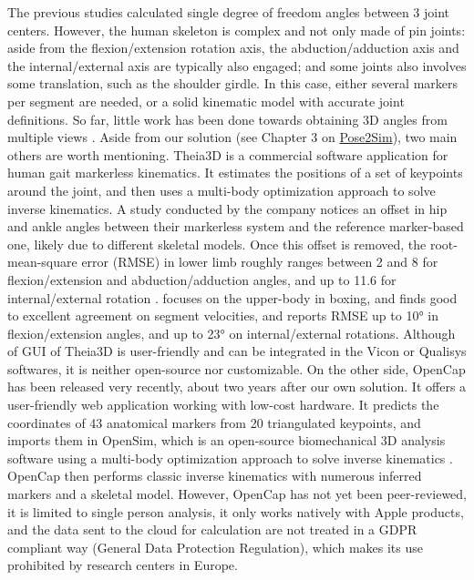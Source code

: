 \newpage
The previous studies calculated single degree of freedom angles between 3 joint centers. However, the human skeleton is complex and not only made of pin joints: aside from the flexion/extension rotation axis, the abduction/adduction axis and the internal/external axis are typically also engaged; and some joints also involves some translation, such as the shoulder girdle. In this case, either several markers per segment are needed, or a solid kinematic model with accurate joint definitions. So far, little work has been done towards obtaining 3D angles from multiple views \cite{Zheng2022}. Aside from our solution (see Chapter 3 on \hyperref[ch:3]{Pose2Sim}), two main others are worth mentioning. Theia3D is a commercial software application for human gait markerless kinematics. It estimates the positions of a set of keypoints around the joint, and then uses a multi-body optimization approach to solve inverse kinematics. A study conducted by the company notices an offset in hip and ankle angles between their markerless system and the reference marker-based one, likely due to different skeletal models. Once this offset is removed, the root-mean-square error (RMSE) in lower limb roughly ranges between 2 and 8\degree{} for flexion/extension and abduction/adduction angles, and up to 11.6\degree{} for internal/external rotation \cite{Kanko2021b}. \cite{Lahkar2022b} focuses on the upper-body in boxing, and finds good to excellent agreement on segment velocities, and reports RMSE up to 10° in  flexion/extension angles, and up to 23° on internal/external rotations. Although of GUI of Theia3D is user-friendly and can be integrated in the Vicon or Qualisys softwares, it is neither open-source nor customizable. On the other side, OpenCap \cite{Uhlrich2022} has been released very recently, about two years after our own solution. It offers a user-friendly web application working with low-cost hardware. It predicts the coordinates of 43 anatomical markers from 20 triangulated keypoints, and imports them in OpenSim, which is an open-source biomechanical 3D analysis software using a multi-body optimization approach to solve inverse kinematics \cite{Delp2007,Seth2018}. OpenCap then performs classic inverse kinematics with numerous inferred markers and a skeletal model. However, OpenCap has not yet been peer-reviewed, it is limited to single person analysis, it only works natively with Apple products, and the data sent to the cloud for calculation are not treated in a GDPR compliant way (General Data Protection Regulation), which makes its use prohibited by research centers in Europe.

